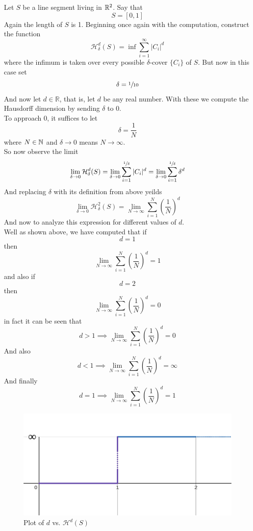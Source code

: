 \documentclass[11pt]{ekblite}
\begin{document}
\begin{example}
	Let $S$ be a line segment living in $\mathbb{R}^2$. Say that
	\[S = [0,1]\]
	Again the length of $S$ is 1. Beginning once again with the computation, construct the function
	\[\mathcal{H}_{\delta}^d (S) = \inf \sum_{i=1}^{\infty} |C_i|^d\]
	where the infimum is taken over every possible $\delta$-cover $\{C_i\}$ of $S$. But now in this case set
	\[\delta = \sfrac{1}{10}\]
	And now let $d \in \mathbb{R}$, that is, let $d$ be any real number. With these we compute the Hausdorff dimension by sending $\delta$ to 0.
	\\[0.2in]To approach 0, it suffices to let
	\[\delta = \frac{1}{N}\]
	where $N \in \mathbb{N}$ and $\delta \rightarrow 0$ means $N \rightarrow \infty$.
	\\[0.2in]So now observe the limit
	\[\lim_{\delta \rightarrow 0} \mathcal{H}_{\delta}^{d} (S) = \lim_{\delta \rightarrow 0} \sum_{i=1}^{\sfrac{1}{\delta}} |C_i|^d = \lim_{\delta \rightarrow 0} \sum_{i=1}^{\sfrac{1}{\delta}} \delta^d\]
	And replacing $\delta$ with its definition from above yeilds 
	\[\lim_{\delta \rightarrow 0} \mathcal{H}_{\delta}^{2} (S) = \lim_{N \rightarrow \infty} \sum_{i=1}^{N} \left( \frac{1}{N} \right)^d\]
	And now to analyze this expression for different values of $d$. 
	\\[0.2in]Well as shown above, we have computed that if
	\[d = 1\]
	then
	\[\lim_{N \rightarrow \infty} \sum_{i=1}^{N} \left( \frac{1}{N} \right)^d = 1\]
	and also if
	\[d = 2\]
	then
	\[\lim_{N \rightarrow \infty} \sum_{i=1}^{N} \left( \frac{1}{N} \right)^d = 0\]
	in fact it can be seen that
	\[d > 1 \implies \lim_{N \rightarrow \infty} \sum_{i=1}^{N} \left( \frac{1}{N} \right)^d = 0\]
	And also 
	\[d < 1 \implies \lim_{N \rightarrow \infty} \sum_{i=1}^{N} \left( \frac{1}{N} \right)^d = \infty\]
	And finally
	\[d = 1 \implies \lim_{N \rightarrow \infty} \sum_{i=1}^{N} \left( \frac{1}{N} \right)^d = 1\]
	\begin{figure}[h]
		\includegraphics[scale=0.25]{img/c22.jpg}
		\caption{Plot of $d$ vs. $\mathcal{H}^d (S)$}
	\end{figure}

\end{example}
\end{document}
